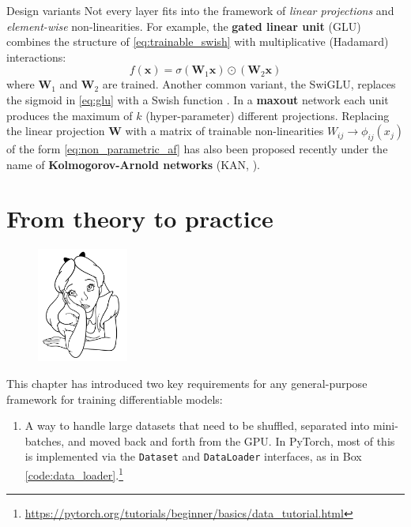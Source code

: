 \begin{supportbox}{Design variants}
Not every layer fits into the framework of \textit{linear projections} and \textit{element-wise} non-linearities. For example, the \textbf{gated linear unit} (GLU) \cite{dauphin2017language} combines the structure of \eqref{eq:trainable_swish} with multiplicative (Hadamard) interactions:
%
\begin{equation}
f(\mathbf{x}) = \sigma\left(\mathbf{W}_1\mathbf{x}\right)\odot\left(\mathbf{W}_2\mathbf{x}\right)
\label{eq:glu}
\end{equation}
%
where $\mathbf{W}_1$ and $\mathbf{W}_2$ are trained. Another common variant, the SwiGLU, replaces the sigmoid in \eqref{eq:glu} with a Swish function \cite{shazeer2020glu}. In a \textbf{maxout} network \cite{goodfellow2013maxout} each unit produces the maximum of $k$ (hyper-parameter) different projections. Replacing the linear projection $\mathbf{W}$ with a matrix of trainable non-linearities $W_{ij} \rightarrow \phi_{ij}(x_j)$ of the form \eqref{eq:non_parametric_af} has also been proposed recently under the name of \textbf{Kolmogorov-Arnold networks} (KAN, \cite{liu2024kan}).
%
\end{supportbox}

\section*{From theory to practice}

\begin{figure}
\vspace{-3em}\includegraphics[width=3.0cm]{images/shutterstock_2075221579.jpg}
\vspace{-5em}
\end{figure}

This chapter has introduced two key requirements for any general-purpose framework for training differentiable models:

\begin{enumerate}
\item A way to handle large datasets that need to be shuffled, separated into mini-batches, and moved back and forth from the GPU. In PyTorch, most of this is implemented via the {\texttt{Dataset}} and \texttt{DataLoader} interfaces, as in Box \ref{code:data_loader}.\footnote{\url{https://pytorch.org/tutorials/beginner/basics/data_tutorial.html}}
\end{enumerate}

